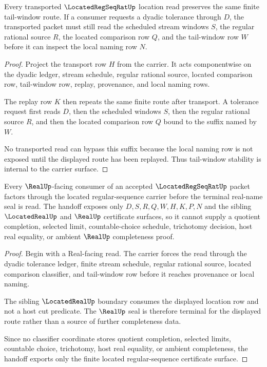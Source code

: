 \begin{theorem}
\label{thm:located-regseqrat-tail-window-stability}
Every transported $\LocatedRegSeqRatUp$ location read preserves the same finite tail-window route. If a consumer requests a dyadic tolerance through $D$, the transported packet must still read the scheduled stream windows $S$, the regular rational source $R$, the located comparison row $Q$, and the tail-window row $W$ before it can inspect the local naming row $N$.
\end{theorem}
\begin{proof}
Project the transport row $H$ from the carrier. It acts componentwise on the dyadic ledger, stream schedule, regular rational source, located comparison row, tail-window row, replay, provenance, and local naming rows.

The replay row $K$ then repeats the same finite route after transport. A tolerance request first reads $D$, then the scheduled windows $S$, then the regular rational source $R$, and then the located comparison row $Q$ bound to the suffix named by $W$.

No transported read can bypass this suffix because the local naming row is not exposed until the displayed route has been replayed. Thus tail-window stability is internal to the carrier surface.
\end{proof}

\begin{theorem}
\label{thm:located-regseqrat-realup-handoff}
Every $\RealUp$-facing consumer of an accepted $\LocatedRegSeqRatUp$ packet factors through the located regular-sequence carrier before the terminal real-name seal is read. The handoff exposes only $D,S,R,Q,W,H,K,P,N$ and the sibling $\LocatedRealUp$ and $\RealUp$ certificate surfaces, so it cannot supply a quotient completion, selected limit, countable-choice schedule, trichotomy decision, host real equality, or ambient $\RealUp$ completeness proof.
\end{theorem}
\begin{proof}
Begin with a Real-facing read. The carrier forces the read through the dyadic tolerance ledger, finite stream schedule, regular rational source, located comparison classifier, and tail-window row before it reaches provenance or local naming.

The sibling $\LocatedRealUp$ boundary consumes the displayed location row and not a host cut predicate. The $\RealUp$ seal is therefore terminal for the displayed route rather than a source of further completeness data.

Since no classifier coordinate stores quotient completion, selected limits, countable choice, trichotomy, host real equality, or ambient completeness, the handoff exports only the finite located regular-sequence certificate surface.
\end{proof}

